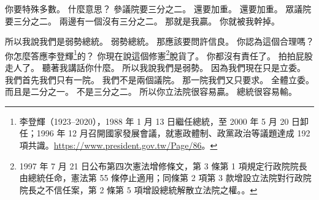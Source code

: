 \hypertarget{w01:cue:2299}{}你要特殊多數。
\hypertarget{w01:cue:2300}{}什麼意思？
\hypertarget{w01:cue:2301}{}參議院要三分之二。
\hypertarget{w01:cue:2302}{}還要加重。
\hypertarget{w01:cue:2303}{}還要加重。
\hypertarget{w01:cue:2304}{}眾議院要三分之二。
\hypertarget{w01:cue:2305}{}兩邊有一個沒有三分之二。
\hypertarget{w01:cue:2306}{}那就是我贏。
\hypertarget{w01:cue:2307}{}你就被我幹掉。

\hypertarget{w01:cue:2308}{}所以我說我們是弱勢總統。
\hypertarget{w01:cue:2309}{}弱勢總統。
\hypertarget{w01:cue:2310}{}那應該要問許信良。
\hypertarget{w01:cue:2311}{}你認為這個合理嗎？
\hypertarget{w01:cue:2312}{}你怎麼答應李登輝\footnote{李登輝（1923–2020），1988 年 1 月 13 日繼任總統，至 2000 年 5 月 20 日卸任；1996 年 12 月召開國家發展會議，就憲政體制、政黨政治等議題達成 192 項共識。\url{https://www.president.gov.tw/Page/86}。}的？
\hypertarget{w01:cue:2313}{}你現在說這個修憲\footnote{1997 年 7 月 21 日公布第四次憲法增修條文，第 3 條第 1 項規定行政院院長由總統任命，憲法第 55 條停止適用；同條第 2 項第 3 款增設立法院對行政院院長之不信任案，第 2 條第 5 項增設總統解散立法院之權。\cite{pres325}。}脫貨了。
\hypertarget{w01:cue:2314}{}你都沒有責任了。
\hypertarget{w01:cue:2315}{}拍拍屁股走人了。
\hypertarget{w01:cue:2316}{}聽著我講話你什麼。
\hypertarget{w01:cue:2317}{}所以我說我們是弱勢。
\hypertarget{w01:cue:2318}{}因為我們現在只是立委。
\hypertarget{w01:cue:2319}{}我們首先我們只有一院。
\hypertarget{w01:cue:2320}{}我們不是兩個議院。
\hypertarget{w01:cue:2321}{}那一院我們又只要求。
\hypertarget{w01:cue:2322}{}全體立委。
\hypertarget{w01:cue:2323}{}而且是二分之一。
\hypertarget{w01:cue:2324}{}不是三分之二。
\hypertarget{w01:cue:2325}{}所以你立法院很容易贏。
\hypertarget{w01:cue:2326}{}總統很容易輸。

